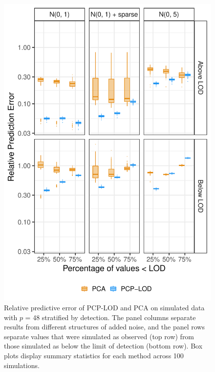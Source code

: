 {\begin{figure}
    \centering
\includegraphics[width=.75\textwidth]{figures/lod_boxplots_48.pdf}
   \caption[Stratified relative error of PCP-LOD and PCA ($p$ = 48)]{Relative predictive error of PCP-LOD and PCA on simulated data with $p$ = 48 stratified by detection. The panel columns separate results from different structures of added noise, and the panel rows separate values that were simulated as observed (top row) from those simulated as below the limit of detection (bottom row). Box plots display summary statistics for each method across 100 simulations.}
    \label{fig:above_below_48}
\end{figure}

}
